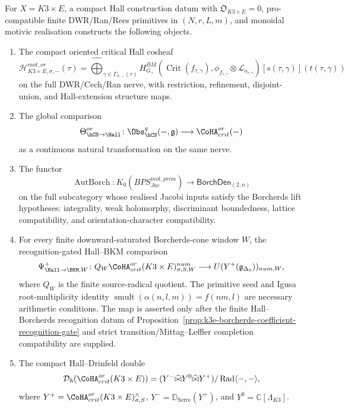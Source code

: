 \begin{theorem}
\label{gluing:thm:compact-k3e-construction-package}
For \(X=K3\times E\), a compact Hall construction datum with
\(\mathfrak O_{K3\times E}=0\), pro-compatible finite
DWR/Ran/Rees primitives in \((N,r,L,m)\), and monoidal motivic
realisation constructs the following objects.
\begin{enumerate}
\item The compact oriented critical Hall cosheaf
\[
 \mathcal H^{mot,or}_{K3\times E,\sigma,-}(\tau)
 =
 \widehat{\bigoplus}_{\gamma\in\Gamma_{\sigma,-}(\tau)}
 H^{BM}_{G_\gamma}
 (\operatorname{Crit}(f_{\tau,\gamma}),
 \phi_{f_{\tau,\gamma}}\otimes\mathscr L_{o_{\tau,\gamma}})
 [s(\tau,\gamma)](t(\tau,\gamma))
\]
on the full DWR/Cech/Ran nerve, with restriction, refinement,
disjoint-union, and Hall-extension structure maps.
\item The global comparison
\[
 \Theta^{or}_{\hCS\to\Hall}\colon
 \Obs_{\hCS}^{q}(-,\mathfrak g)\longrightarrow
 \CoHA^{or}_{crit}(-)
\]
as a continuous natural transformation on the same nerve.
\item The functor
\[
 \operatorname{AutBorch}\colon
 K_0(BPS^{mot,prim}_{Jac})
 \longrightarrow
 \mathsf{BorchDen}_{(2,n)}
\]
on the full subcategory whose realised Jacobi inputs satisfy the
Borcherds lift hypotheses: integrality, weak holomorphy, discriminant
boundedness, lattice compatibility, and orientation-character
compatibility.
\item For every finite downward-saturated Borcherds-cone window \(W\),
the recognition-gated Hall--BKM comparison
\[
 \Psi^+_{\Hall\to\BKM,W}\colon
 Q_W\CoHA^{or}_{crit}(K3\times E)_{\sigma,S,W}^{num}
 \longrightarrow
 U(Y^+(\mathfrak g_{\Delta_5}))_{num,W},
\]
where \(Q_W\) is the finite source-radical quotient. The primitive seed
and Igusa root-multiplicity identity
\(\operatorname{smult}(\alpha(n,l,m))=f(nm,l)\) are necessary arithmetic
conditions. The map is asserted only after the finite Hall--Borcherds
recognition datum of
Proposition~\ref{prop:k3e-borcherds-coefficient-recognition-gate} and
strict transition/Mittag--Leffler completion compatibility are supplied.
\item The compact Hall--Drinfeld double
\[
 \mathcal D_\hbar(\CoHA^{or}_{crit}(K3\times E))
 =
 (Y^-\widehat\bowtie Y^0\widehat\bowtie Y^+)/
 \operatorname{Rad}\langle-,-\rangle,
\]
where \(Y^+=\CoHA^{or}_{crit}(K3\times E)_{\sigma,S}^{\wedge}\),
\(Y^-=\mathbb D_{\mathrm{Serre}}(Y^+)\), and
\(Y^0=\widehat{\mathbb C[\Lambda_{K3}]}\).

\end{enumerate}
\end{theorem}
